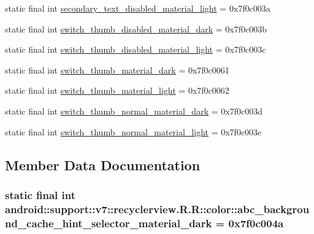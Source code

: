 \begin{CompactItemize}
\item 
static final int \hyperlink{classandroid_1_1support_1_1v7_1_1recyclerview_1_1_r_1_1color_ba5d2709428f34b89ee141dc06641025}{secondary\_\-text\_\-disabled\_\-material\_\-light} = 0x7f0c003a
\item 
static final int \hyperlink{classandroid_1_1support_1_1v7_1_1recyclerview_1_1_r_1_1color_e588d5df24fcb7587e0c533981f9c6cf}{switch\_\-thumb\_\-disabled\_\-material\_\-dark} = 0x7f0c003b
\item 
static final int \hyperlink{classandroid_1_1support_1_1v7_1_1recyclerview_1_1_r_1_1color_ee53b696cf4b6d8ed65d104a8b333e34}{switch\_\-thumb\_\-disabled\_\-material\_\-light} = 0x7f0c003c
\item 
static final int \hyperlink{classandroid_1_1support_1_1v7_1_1recyclerview_1_1_r_1_1color_87e0d611952f6fd67b95a910ad7a27e7}{switch\_\-thumb\_\-material\_\-dark} = 0x7f0c0061
\item 
static final int \hyperlink{classandroid_1_1support_1_1v7_1_1recyclerview_1_1_r_1_1color_2d8b0b54dfd3ab42a91dc62ec9c240af}{switch\_\-thumb\_\-material\_\-light} = 0x7f0c0062
\item 
static final int \hyperlink{classandroid_1_1support_1_1v7_1_1recyclerview_1_1_r_1_1color_a290fe0f634326db6c74a814dbdd9368}{switch\_\-thumb\_\-normal\_\-material\_\-dark} = 0x7f0c003d
\item 
static final int \hyperlink{classandroid_1_1support_1_1v7_1_1recyclerview_1_1_r_1_1color_12310534aed6861c1ab7a21c3491b0aa}{switch\_\-thumb\_\-normal\_\-material\_\-light} = 0x7f0c003e
\end{CompactItemize}


\subsection{Member Data Documentation}
\hypertarget{classandroid_1_1support_1_1v7_1_1recyclerview_1_1_r_1_1color_7061a06dd65db006848ee2063aced724}{
\subsubsection[{abc\_\-background\_\-cache\_\-hint\_\-selector\_\-material\_\-dark}]{\setlength{\rightskip}{0pt plus 5cm}static final int android::support::v7::recyclerview.R.R::color::abc\_\-background\_\-cache\_\-hint\_\-selector\_\-material\_\-dark = 0x7f0c004a}}
\label{classandroid_1_1support_1_1v7_1_1recyclerview_1_1_r_1_1color_7061a06dd65db006848ee2063aced724}


